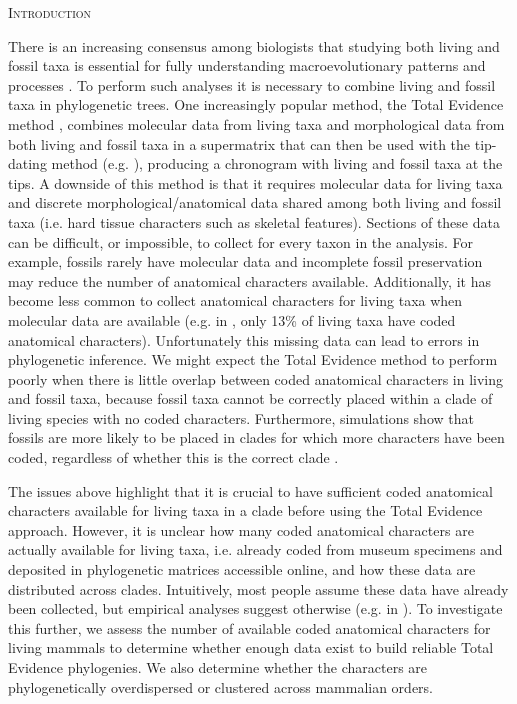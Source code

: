 \documentclass[12pt,letterpaper]{article}
\renewcommand{\section}[1]{%
\bigskip
\begin{center}
\begin{Large}
\normalfont\scshape #1
\medskip
\end{Large}
\end{center}}
\begin{document}
\section{Introduction}
There is an increasing consensus among biologists that studying both living and fossil taxa is essential for fully understanding macroevolutionary patterns and processes \cite{slaterunifying2013,fritzdiversity2013}.
To perform such analyses it is necessary to combine living and fossil taxa in phylogenetic trees.
One increasingly popular method, the Total Evidence method \cite{ronquista2012}, combines molecular data from living taxa and morphological data from both living and fossil taxa in a supermatrix that can then be used with the tip-dating method (e.g. \cite{pyrondivergence2011,ronquista2012,schragocombining2013,slaterunifying2013,beckancient2014}), producing a chronogram with living and fossil taxa at the tips.
A downside of this method is that it requires molecular data for living taxa and discrete morphological/anatomical data shared among both living and fossil taxa (i.e. hard tissue characters such as skeletal features). %
Sections of these data can be difficult, or impossible, to collect for every taxon in the analysis.
For example, fossils rarely have molecular data and incomplete fossil preservation may reduce the number of anatomical characters available.
Additionally, it has become less common to collect anatomical characters for living taxa when molecular data are available (e.g. in \cite{slaterphylogenetic2013}, only 13\% of living taxa have coded anatomical characters).
Unfortunately this missing data can lead to errors in phylogenetic inference.
We might expect the Total Evidence method to perform poorly when there is little overlap between coded anatomical characters in living and fossil taxa, because fossil taxa cannot be correctly placed within a clade of living species with no coded characters.
Furthermore, simulations show that fossils are more likely to be placed in clades for which more characters have been coded, regardless of whether this is the correct clade \cite{GuillermeCooper}.

The issues above highlight that it is crucial to have sufficient coded anatomical characters available for living taxa in a clade before using the Total Evidence approach.
However, it is unclear how many coded anatomical characters are actually available for living taxa, i.e. already coded from museum specimens and deposited in phylogenetic matrices accessible online, and how these data are distributed across clades.
Intuitively, most people assume these data have already been collected, but empirical analyses suggest otherwise (e.g. in \cite{ronquista2012,slaterphylogenetic2013,beckancient2014}).
To investigate this further, we assess the number of available coded anatomical characters for living mammals to determine whether enough data exist to build reliable Total Evidence phylogenies.
We also determine whether the characters are phylogenetically overdispersed or clustered across mammalian orders.
\end{document}
